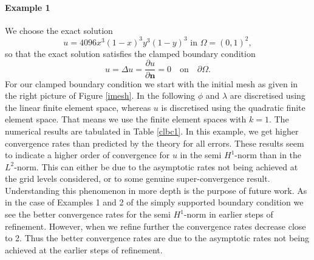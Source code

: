 \documentclass[a4paper,final]{siamltex}
\begin{document}
\paragraph{Example 1}
We choose the exact solution 
\begin{equation}\label{ex.sol.3}
u = 4096x^3(1-x)^3y^3(1-y)^3 \text{ in $\Omega = \left(0,1\right)^2$}, 
\end{equation}
so that the exact solution satisfies the clamped boundary condition 
\[ u = \Delta u = \frac{\partial u}{\partial \textbf{n}} =0 \quad\text{on}\quad 
\partial \Omega.\]
For our clamped boundary condition 
we start with the initial mesh as given in the right picture of Figure \ref{imesh}. 
In the following $\phi$ and $\lambda$ are discretised using the linear finite element space, whereas 
$u$ is discretised using the quadratic finite element space. That means we use the finite element spaces 
with $k=1$. 
The numerical results are tabulated in  Table \ref{clbc1}. In this example, we get 
higher convergence rates than predicted by the theory for all errors. 
These results seem to indicate a higher order of convergence for $u$ in the semi
 $H^1$-norm than in 
the $L^2$-norm. This can
either be due to the asymptotic rates not being achieved at the grid levels considered, or to some genuine
super-convergence result. Understanding this phenomenon in more depth is the purpose of future work.
As in the case of Examples 1 and 2 of the simply supported boundary condition we see the 
better convergence rates for the  semi $H^1$-norm in earlier steps of refinement. 
However, when we refine further the convergence rates decrease close to 2. Thus the better convergence rates 
are due to the asymptotic rates not being achieved at the earlier steps of refinement. 
\end{document}
